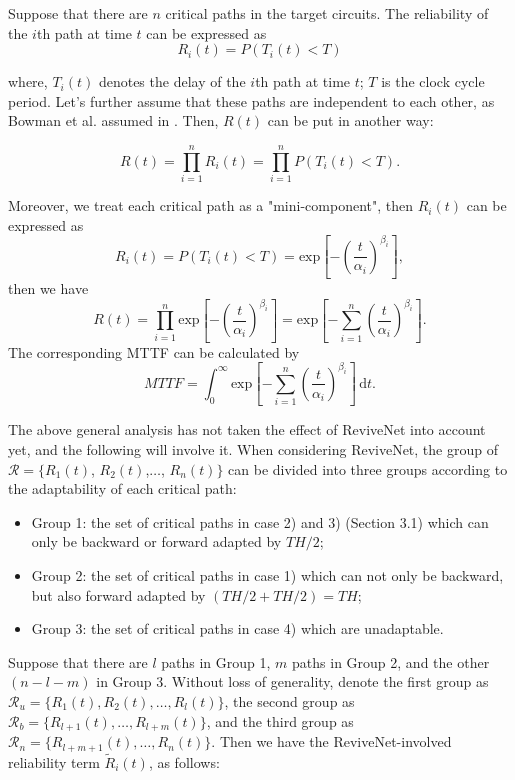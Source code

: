 Suppose that there are $n$ critical paths in the target circuits. The reliability of the $i$th path at time $t$ can be expressed as
\begin{equation}
  R_i(t)=P(T_i(t)<T)
\end{equation}

where, $T_i(t)$ denotes the delay of the $i$th path at time $t$; $T$ is the clock cycle period. Let's further assume that these paths are independent to each other, as Bowman et al. assumed in \cite{variation_jssc02}. Then, $R(t)$ can be put in another way:

\begin{equation}\label{anotherway}
  R(t)=\prod^n_{i=1} R_i(t)=\prod^n_{i=1} P(T_i(t)<T).
\end{equation}

Moreover, we treat each critical path as a "mini-component", then $R_i(t)$ can be expressed as
\begin{equation}
  R_i(t)=P(T_i(t)<T)=\mbox{exp}[-(\frac{t}{\alpha_i})^{\beta_i}],
\end{equation}
then we have
\begin{equation}
  R(t)=\prod^n_{i=1}
  \mbox{exp}[-(\frac{t}{\alpha_i})^{\beta_i}]=\mbox{exp}[-\sum^n_{i=1}(\frac{t}{\alpha_i})^{\beta_i}].
\end{equation}
The corresponding MTTF can be calculated by
\begin{equation}\label{mttf}
  MTTF=\int^{\infty}_{0} \mbox{exp}[-\sum^n_{i=1}(\frac{t}{\alpha_i})^{\beta_i}]\,\mbox{d}t.
\end{equation}

The above general analysis has not taken the effect of ReviveNet into account yet, and the following will involve it. When considering ReviveNet, the group of $\mathcal{R}=\{$$R_1(t)$, $R_2(t)$,$\ldots$, $R_n(t)\}$ can be divided into three groups according to the adaptability of each critical path:
\begin{itemize}
  \item Group 1: the set of critical paths in case 2) and 3) (Section 3.1) which can only be backward or forward adapted by $TH/2$;
  \item Group 2: the set of critical paths in case 1) which can not only be backward, but also forward adapted by $(TH/2+TH/2)=TH$;
  \item Group 3: the set of critical paths in case 4) which are unadaptable.
\end{itemize}

 Suppose that there are $l$ paths in Group 1, $m$ paths in Group 2, and the other $(n-l-m)$ in Group 3. Without  loss of generality, denote the first group as $\mathcal{R}_{u}=\{R_1(t), R_2(t),\ldots, R_l(t)\}$, the second group as $\mathcal{R}_{b}=\{R_{l+1}(t), \ldots, R_{l+m}(t)\}$, and the third group as $\mathcal{R}_{n}=\{R_{l+m+1}(t), \ldots, R_{n}(t)\}$. Then we have the ReviveNet-involved reliability term $\widetilde{R}_i(t)$, as follows:

